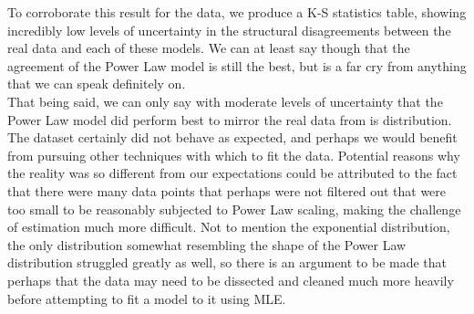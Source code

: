 To corroborate this result for the data, we produce a K-S statistics table, showing incredibly low levels of uncertainty in the structural disagreements between the real data and each of these models. We can at least say though that the agreement of the Power Law model is still the best, but is a far cry from anything that we can speak definitely on.\\

That being said, we can only say with moderate levels of uncertainty that the Power Law model did perform best to mirror the real data from is distribution. The dataset certainly did not behave as expected, and perhaps we would benefit from pursuing other techniques with which to fit the data. Potential reasons why the reality was so different from our expectations could be attributed to the fact that there were many data points that perhaps were not filtered out that were too small to be reasonably subjected to Power Law scaling, making the challenge of estimation much more difficult. Not to mention the exponential distribution, the only distribution somewhat resembling the shape of the Power Law distribution struggled greatly as well, so there is an argument to be made that perhaps that the data may need to be dissected and cleaned much more heavily before attempting to fit a model to it using MLE. \\

